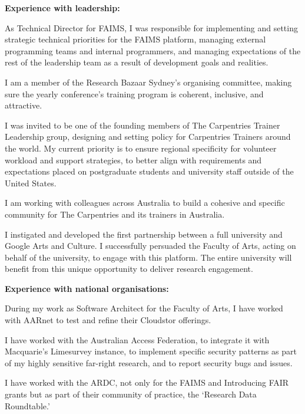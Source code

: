 \documentclass[11pt, a4paper]{awesome-cv}
\begin{document}
\begin{cvletter}
\textbf{Experience with leadership:} 
\begin{letteritems}

\item {As Technical Director for FAIMS, I was responsible for implementing and setting strategic technical priorities for the FAIMS platform, managing external programming teams and internal programmers, and managing expectations of the rest of the leadership team as a result of development goals and realities.}
\item {I am a member of the Research Bazaar Sydney's organising committee, making sure the yearly conference's training program is coherent, inclusive, and attractive.}
\item {I was invited to be one of the founding members of The Carpentries Trainer Leadership group, designing and setting policy for Carpentries Trainers around the world. My current priority is to ensure regional specificity for volunteer workload and support strategies, to better align with requirements and expectations placed on postgraduate students and university staff outside of the United States. }
\item {I am working with colleagues across Australia to build a cohesive and specific community for The Carpentries and its trainers in Australia.}
\item {I instigated and developed the first partnership between a full university and Google Arts and Culture. I successfully persuaded the Faculty of Arts, acting on behalf of the university, to engage with this platform. The entire university will benefit from this unique opportunity to deliver research engagement.}
\end{letteritems}


\textbf{Experience with national organisations:} 
\begin{letteritems}
\item {During my work as Software Architect for the Faculty of Arts, I have worked with AARnet to test and refine their Cloudstor offerings.}
\item {I have worked with the Australian Access Federation, to integrate it with Macquarie's Limesurvey instance, to implement specific security patterns as part of my highly sensitive far-right research, and to report security bugs and issues.}
\item {I have worked with the ARDC, not only for the FAIMS and Introducing FAIR grants but as part of their community of practice, the `Research Data Roundtable.'}
\end{letteritems}



\end{cvletter}
\end{document}
